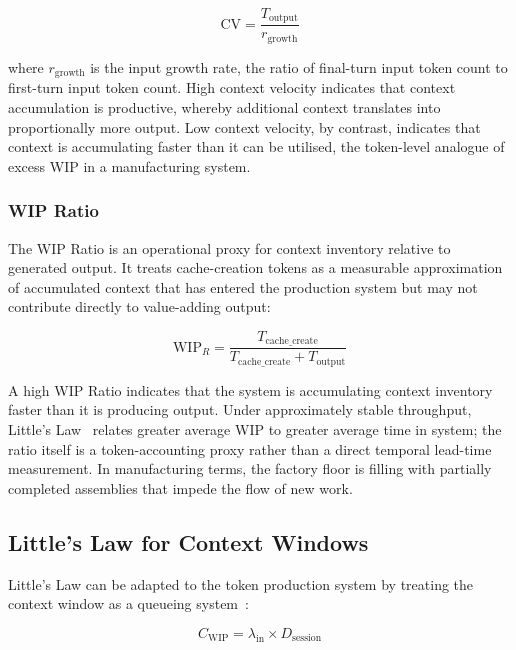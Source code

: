 \documentclass[journal]{IEEEtran}
\begin{document}
\begin{equation}
\text{CV} = \frac{T_{\text{output}}}{r_{\text{growth}}}
\label{eq:cv}
\end{equation}

\noindent where $r_{\text{growth}}$ is the input growth rate, the ratio of final-turn input token count to first-turn input token count. High context velocity indicates that context accumulation is productive, whereby additional context translates into proportionally more output. Low context velocity, by contrast, indicates that context is accumulating faster than it can be utilised, the token-level analogue of excess WIP in a manufacturing system.

\subsubsection{WIP Ratio}

The WIP Ratio is an operational proxy for context inventory relative to generated output. It treats cache-creation tokens as a measurable approximation of accumulated context that has entered the production system but may not contribute directly to value-adding output:

\begin{equation}
\text{WIP}_R = \frac{T_{\text{cache\_create}}}{T_{\text{cache\_create}} + T_{\text{output}}}
\label{eq:wip}
\end{equation}

\noindent A high WIP Ratio indicates that the system is accumulating context inventory faster than it is producing output. Under approximately stable throughput, Little's Law~\cite{little1961} relates greater average WIP to greater average time in system; the ratio itself is a token-accounting proxy rather than a direct temporal lead-time measurement. In manufacturing terms, the factory floor is filling with partially completed assemblies that impede the flow of new work.

\subsection{Little's Law for Context Windows}

Little's Law can be adapted to the token production system by treating the context window as a queueing system~\cite{kleinrock1975}:

\begin{equation}
C_{\text{WIP}} = \lambda_{\text{in}} \times D_{\text{session}}
\label{eq:little}
\end{equation}
\end{document}
